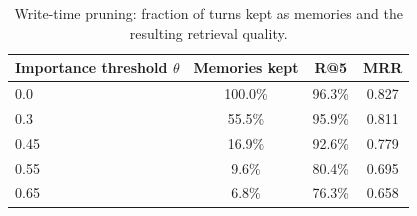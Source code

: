 \begin{table}[htbp]\centering\small
\begin{tabular}{lccc}\hline
\textbf{Importance threshold $\theta$} & \textbf{Memories kept} & \textbf{R@5} & \textbf{MRR}\\\hline
0.0 & 100.0\% & 96.3\% & 0.827\\
0.3 & 55.5\% & 95.9\% & 0.811\\
0.45 & 16.9\% & 92.6\% & 0.779\\
0.55 & 9.6\% & 80.4\% & 0.695\\
0.65 & 6.8\% & 76.3\% & 0.658\\
\hline\end{tabular}
\caption{Write-time pruning: fraction of turns kept as memories and the resulting retrieval quality.}\label{tab:pruning}\end{table}

